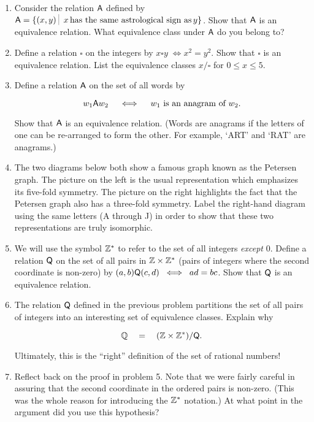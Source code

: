 \begin{enumerate}
\item Consider the relation $\mbox{\textsf A}$ defined by 
$ \relA = \{ (x,y) \suchthat \; x \, \mbox{has the same astrological sign as} \, y \}$.  Show that $\mbox{\textsf A}$ is an equivalence relation.  What equivalence class
under $\mbox{\textsf A}$ do you belong to?
\item Define a relation $\square$ on the integers by $x \square y \; \iff x^2 = y^2$.  Show that $\square$ is an equivalence relation.  List the equivalence
classes $x/\square$ for $0 \leq x \leq 5$.
\item Define a relation $\mbox{\textsf A}$ on the set of all words by

\[ w_1 \mbox{\textsf A} w_2 \quad \iff \quad w_1 \mbox{ is an anagram of } w_2. \]

\noindent Show that $\mbox{\textsf A}$ is an equivalence relation.  (Words are anagrams
if the letters of one can be re-arranged to form the other.  For example, `ART' and `RAT' are anagrams.)
\item The two diagrams below both show a famous graph known as the 
Petersen graph.  The picture on the 
left is the usual representation which emphasizes its five-fold symmetry.  The picture on the right
highlights the fact that the Petersen graph also has a three-fold symmetry.  Label the right-hand diagram
using the same letters (A through J) in order to show that these two representations are truly isomorphic.

\vspace{.2in}

\rule{0pt}{0pt} \hspace{-.75in} 

\vspace{.2in}

\clearpage

\item We will use the symbol ${\mathbb Z}^{\ast}$ to refer to the set of
all integers \emph{except} $0$.  
Define a relation $\mbox{\textsf Q}$ on the set of all pairs in ${\mathbb Z} \times {\mathbb Z}^{\ast}$ (pairs of integers where the second coordinate is non-zero) by
$(a,b) \mbox{\textsf Q} (c,d) \; \iff \; ad=bc$.  Show that $\mbox{\textsf Q}$ is an 
equivalence relation.

\item The relation $\mbox{\textsf Q}$ defined in the previous problem partitions
the set of all pairs of integers into an interesting set of equivalence
classes.  Explain why 

\[ {\mathbb Q} \quad = \quad ({\mathbb Z} \times {\mathbb Z}^{\ast}) / \mbox{\textsf Q}. \]

\noindent Ultimately, this is the ``right'' definition of the set 
of rational numbers!

\item Reflect back on the proof in problem 5.  Note that we were fairly
careful in assuring that the second coordinate in the ordered pairs is
non-zero. (This was the whole reason for introducing the 
${\mathbb Z}^{\ast}$ notation.)  At what point in the argument did you
use this hypothesis?

\end{enumerate} 

